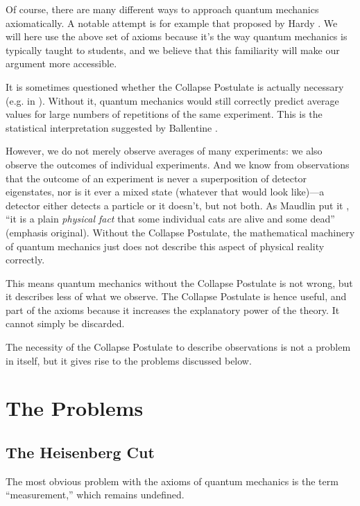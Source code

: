 \documentclass[superscriptaddress,floatfix,nofootinbib,12pt]{revtex4-2}
\begin{document}
Of course, there are many different ways to approach quantum mechanics axiomatically. A notable attempt is for example that proposed by Hardy \cite{hardy2001quantum}. We will here use the above set of axioms because it's the way quantum mechanics is typically taught to students, and we believe that this familiarity will make our argument more accessible. 

It is sometimes questioned whether the Collapse Postulate is actually necessary (e.g. in \cite{zurek2018quantum}). Without it, quantum mechanics would still correctly predict average values for large numbers of repetitions of the same experiment. This is the statistical interpretation suggested by Ballentine \cite{ballentine1970statistical}. 

However, we do not merely observe averages of many experiments: we also observe the outcomes of individual experiments. And we know from observations that the outcome of an experiment is never a superposition of detector eigenstates, nor is it ever a mixed state (whatever that would look like)---a detector either detects a particle or it doesn't, but not both. As Maudlin put it \cite{Maudlin1995ThreeMP}, ``it is a plain \emph{physical fact} that some individual cats are alive and some dead'' (emphasis original). Without the Collapse Postulate, the mathematical machinery of quantum mechanics just does not describe this aspect of physical reality correctly.

This means quantum mechanics without the Collapse Postulate is not wrong, but it describes less of what we observe. The Collapse Postulate is hence useful, and part of the axioms because it increases the explanatory power of the theory. It cannot simply be discarded.

The necessity of the Collapse Postulate to describe observations is not a problem in itself, but it gives rise to the problems discussed below. 

\section{The Problems}
\label{sec:prob}
 
\subsection{The Heisenberg Cut}
 
The most obvious problem with the axioms of quantum mechanics is the term ``measurement,'' which remains undefined. 
 
\end{document}
